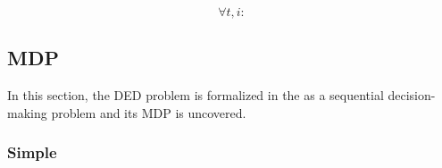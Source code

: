 \begin{equation}
	\forall t, i: 
\end{equation}


\subsection{\acf{MDP}}

In this section, the \ac{DED} problem is formalized in the as a sequential decision-making problem and its \ac{MDP} is uncovered. 

\subsubsection{Simple}


